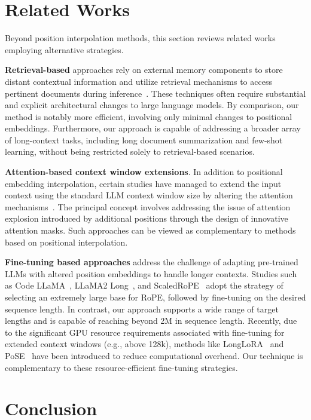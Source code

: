 \section{Related Works}

Beyond position interpolation methods, this section reviews related works employing alternative strategies.

\textbf{Retrieval-based} approaches rely on external memory components to store distant contextual information and utilize retrieval mechanisms to access pertinent documents during inference~\cite{longllama,wang2023augmenting,borgeaud2022improving}. These techniques often require substantial and explicit architectural changes to large language models. By comparison, our method is notably more efficient, involving only minimal changes to positional embeddings. Furthermore, our approach is capable of addressing a broader array of long-context tasks, including long document summarization and few-shot learning, without being restricted solely to retrieval-based scenarios.

\textbf{Attention-based context window extensions}. In addition to positional embedding interpolation, certain studies have managed to extend the input context using the standard LLM context window size by altering the attention mechanisms~\cite{han2023lminfinite, streamingllm,parallelwindow}. The principal concept involves addressing the issue of attention explosion introduced by additional positions through the design of innovative attention masks. Such approaches can be viewed as complementary to methods based on positional interpolation.

\textbf{Fine-tuning based approaches} address the challenge of adapting pre-trained LLMs with altered position embeddings to handle longer contexts. Studies such as Code LLaMA~\cite{codellama}, LLaMA2 Long~\cite{xiong2023effective}, and ScaledRoPE~\cite{liu2023scaling} adopt the strategy of selecting an extremely large base for RoPE, followed by fine-tuning on the desired sequence length. In contrast, our approach supports a wide range of target lengths and is capable of reaching beyond 2M in sequence length. Recently, due to the significant GPU resource requirements associated with fine-tuning for extended context windows (e.g., above 128k), methods like LongLoRA~\cite{longlora} and PoSE~\cite{zhu2023pose} have been introduced to reduce computational overhead. Our technique is complementary to these resource-efficient fine-tuning strategies.

\section{Conclusion}

